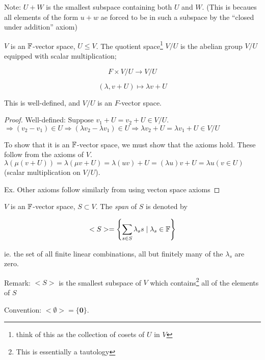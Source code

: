 \documentclass[a4paper]{article}
\begin{document}
Note: $ U + W $ is the smallest subspace containing both $ U $ and $ W $. (This is becaues all elements of the form $ u + w $ ae forced to be in such a subspace by the ``closed under addition'' axiom)


\begin{defi}
	$ V $ is an $ \mathbb{F} $-vector space, $ U \leq V $. The quotient space\footnote{think of this as the collection of cosets of $ U $ in $ V $ } $ V / U $ is the abelian group $ V / U $ equipped with scalar multiplication;
	
	\[ F \times V / U \to V / U \]
	
	\[ (\lambda, v + U) \mapsto \lambda v + U \]
\end{defi}

\begin{prop} 
	This is well-defined, and $ V/U $ is an $ F $-vector space.
\end{prop}

\begin{proof}
	Well-defined: Suppose $ v_{1} + U = v_{2} + U \in V / U $. $ \Rightarrow (v_{2} - v_{1}) \in U \Rightarrow ( \lambda v_{2} - \lambda v_{1}) \in U \Rightarrow \lambda v_{2} + U = \lambda v_{1} + U \in V / U $

To show that it is an $ \mathbb{F} $-vector space, we must show that the axioms hold. These follow from the axioms of $ V $.
$ \lambda ( \mu (v + U)) = \lambda ( \mu v + U) = \lambda(u v) + U = (\lambda u) v + U  = \lambda u (v \in U) $ (scalar multiplication on $ V / U $). 

Ex. Other axioms follow similarly from using vecton space axioms

\end{proof}

\begin{defi}
	$ V $ is an $ \mathbb{F} $-vector space, $ S \subset V $. The \emph{span} of $ S $ is denoted by 
	
	\[ <S> = \left\{ \sum_{s \in S}  \lambda_{s} s \; | \; \lambda_{s} \in \mathbb{F} \right\}  \]
	
	ie. the set of all finite linear combinations, all but finitely many of the $ \lambda_{s} $ are zero.
\end{defi}

Remark: $ <S> $ is the smallest subspace of $ V $ which contains\footnote{This is essentially a tautology} all of the elements of $ S $

Convention: $  < \emptyset > = \{ \mathbf{0} \} $.
\end{document}
